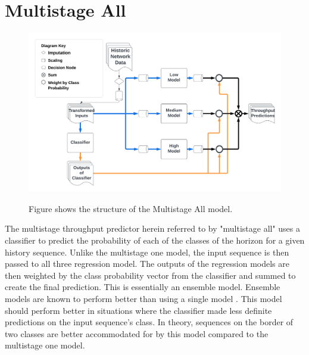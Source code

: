 \section{Multistage All}
\begin{figure}[h]
\includegraphics[scale=0.15]{Multistage All.png}
\label{fig:multistage_one}
\caption{Figure shows the structure of the Multistage All model.}
\end{figure}

The multistage throughput predictor herein referred to by "multistage all" uses a classifier to predict the probability of each of the classes of the horizon for a given history sequence. Unlike the multistage one model, the input sequence is then passed to all three regression model. The outputs of the regression models are then weighted by the class probability vector from the classifier and summed to create the final prediction. This is essentially an ensemble model. Ensemble models are known to perform better than using a single model \cite{https://doi.org/10.1002/widm.1249}. This model should perform better in situations where the classifier made less definite predictions on the input sequence's class. In theory, sequences on the border of two classes are better accommodated for by this model compared to the multistage one model.